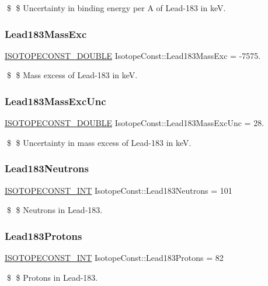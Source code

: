 \$ \$ Uncertainty in binding energy per A of Lead-\/183 in keV. \mbox{\label{group___isotope_const-_lead-_pb183_ga8aa13a2f61009864e5f8ca3b59f506eb}} 
\subsubsection{\texorpdfstring{Lead183\+Mass\+Exc}{Lead183MassExc}}
{\footnotesize\ttfamily \mbox{\hyperlink{group___isotope_const-_macros_ga8f45a7272ce02c0b4c65c44636ed719a}{I\+S\+O\+T\+O\+P\+E\+C\+O\+N\+S\+T\+\_\+\+D\+O\+U\+B\+LE}} Isotope\+Const\+::\+Lead183\+Mass\+Exc = -\/7575.}

\$ \$ Mass excess of Lead-\/183 in keV. \mbox{\label{group___isotope_const-_lead-_pb183_gab6d8a3476cc1dceac8346837164aca53}} 
\subsubsection{\texorpdfstring{Lead183\+Mass\+Exc\+Unc}{Lead183MassExcUnc}}
{\footnotesize\ttfamily \mbox{\hyperlink{group___isotope_const-_macros_ga8f45a7272ce02c0b4c65c44636ed719a}{I\+S\+O\+T\+O\+P\+E\+C\+O\+N\+S\+T\+\_\+\+D\+O\+U\+B\+LE}} Isotope\+Const\+::\+Lead183\+Mass\+Exc\+Unc = 28.}

\$ \$ Uncertainty in mass excess of Lead-\/183 in keV. \mbox{\label{group___isotope_const-_lead-_pb183_ga595e396b762171e679263ea3220bbfd9}} 
\subsubsection{\texorpdfstring{Lead183\+Neutrons}{Lead183Neutrons}}
{\footnotesize\ttfamily \mbox{\hyperlink{group___isotope_const-_macros_ga5f18360b3e99483a35c32d789e62621c}{I\+S\+O\+T\+O\+P\+E\+C\+O\+N\+S\+T\+\_\+\+I\+NT}} Isotope\+Const\+::\+Lead183\+Neutrons = 101}

\$ \$ Neutrons in Lead-\/183. \mbox{\label{group___isotope_const-_lead-_pb183_gacb8c12161f0e7469c0044e5618512d35}} 
\subsubsection{\texorpdfstring{Lead183\+Protons}{Lead183Protons}}
{\footnotesize\ttfamily \mbox{\hyperlink{group___isotope_const-_macros_ga5f18360b3e99483a35c32d789e62621c}{I\+S\+O\+T\+O\+P\+E\+C\+O\+N\+S\+T\+\_\+\+I\+NT}} Isotope\+Const\+::\+Lead183\+Protons = 82}

\$ \$ Protons in Lead-\/183. 
